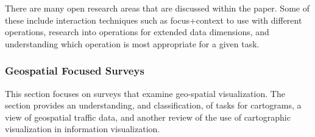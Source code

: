 
There are many open research areas that are discussed within the paper. Some of these include interaction techniques such as focus+context to use with different operations, research into operations for extended data dimensions, and understanding which operation is most appropriate for a given task.


\subsubsection{Geospatial Focused Surveys}
This section focuses on surveys that examine geo-spatial visualization. The section provides an understanding, and classification, of tasks for cartograms, a view of geospatial traffic data, and another review of the use of cartographic visualization in information visualization.

